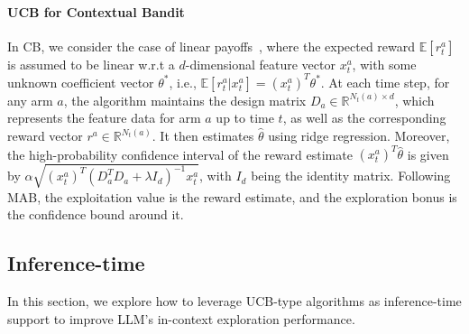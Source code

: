 \paragraph{UCB for Contextual Bandit}
In CB, we consider the case of linear payoffs~\citep{li2010contextual,chu2011contextual}, where the expected reward $\mathbb{E}[r^a_t]$ is assumed to be linear w.r.t a $d$-dimensional feature vector $x^a_{t}$, with some unknown coefficient vector
$\theta^{*}$, i.e., $\mathbb{E}[r^a_t|x^a_t]=(x^a_t)^T\theta^{*}$. At each time step, for any arm $a$, the algorithm maintains the design matrix $D_a\in\mathbb{R}^{N_t(a)\times d}$, which represents the feature data for arm $a$ up to time $t$, as well as the corresponding reward vector $r^a\in\mathbb{R}^{N_t(a)}$. It then estimates $\hat{\theta}$ using ridge regression. Moreover, the high-probability confidence interval of the reward estimate $(x^a_t)^T\hat{\theta}$ is given by $\alpha\sqrt{(x^a_t)^T(D^T_aD_a+\lambda I_d)^{-1}x^a_t}$, with $I_d$ being the identity matrix.
Following MAB, the exploitation value is the reward estimate, and the exploration bonus is the confidence bound around it.


\subsection{Inference-time \ag}
\label{subsec: guided_support}
In this section, we explore how to leverage UCB-type algorithms as inference-time support to improve LLM's in-context exploration performance. 


